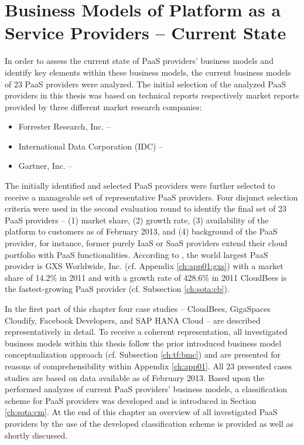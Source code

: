 \chapter{Business Models of Platform as a Service Providers -- Current State}\label{ch:sota}

In order to assess the current state of \ac{PaaS} providers' business models and identify key elements within these business models, the current business models of 23 \ac{PaaS} providers were analyzed. The initial selection of the analyzed \ac{PaaS} providers in this thesis was based on technical reports respectively market reports provided by three different market research companies:
\begin{itemize}[parsep=0pt, topsep=0pt, itemsep=0pt]
	\item Forrester Research, Inc. -- \citet{Rymer2011,Ried2011a}
	\item International Data Corporation (IDC) -- \citet{Bradshaw2012,Hendrick2012, Hendrick2012a}
	\item Gartner, Inc. -- \citet{Smith2012}
\end{itemize}
The initially identified and selected \ac{PaaS} providers were further selected to receive a manageable set of representative \ac{PaaS} providers. Four disjunct selection criteria were used in the second evaluation round to identify the final set of 23 \ac{PaaS} providers -- (1) market share, (2) growth rate, (3) availability of the platform to customers as of February 2013, and (4) background of the \ac{PaaS} provider, for instance, former purely \ac{IaaS} or \ac{SaaS} providers extend their cloud portfolio with \ac{PaaS} functionalities. According to \citet{Hendrick2012}, the world largest \ac{PaaS} provider is GXS Worldwide, Inc. (cf. Appendix \ref{ch:app01:gxs}) with a market share of 14.2\% in 2011 and with a growth rate of 428.6\% in 2011 CloudBees  is the fastest-growing \ac{PaaS} provider (cf. Subsection \ref{ch:sota:cb}).

In the first part of this chapter four case studies -- CloudBees, GigaSpaces Cloudify, Facebook Developers, and SAP HANA Cloud -- are described representatively in detail. To receive a coherent representation, all investigated business models within this thesis follow the prior introduced business model conceptualization approach (cf. Subsection \ref{ch:tf:bmc}) and are presented for reasons of comprehensibility within Appendix \ref{ch:app01}. All 23 presented cases studies are based on data available as of February 2013. Based upon the performed analyzes of current \ac{PaaS} providers' business models, a classification scheme for \ac{PaaS} providers was developed and is introduced in Section \ref{ch:sota:cm}. At the end of this chapter an overview of all investigated \ac{PaaS} providers by the use of the developed classification scheme is provided as well as shortly discussed.

